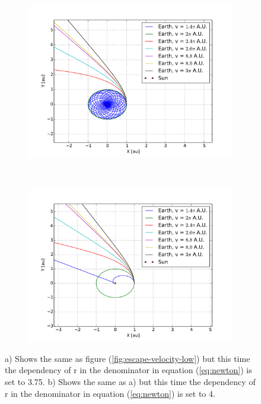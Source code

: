\begin{figure}[H]
    \centering
    \begin{subfigure}{0.5\textwidth}
        \centering
        \includegraphics[width=\linewidth]{result/bilder/escape-velocity-r275.pdf}
    	\caption{}
    \end{subfigure}%
    ~ 
    \begin{subfigure}{0.5\textwidth}
        \centering
        \includegraphics[width=\linewidth]{result/bilder/escape-velocity-r3.pdf}
        \caption{}
    \end{subfigure}
    \caption{a) Shows the same as figure (\ref{fig:escape-velocity-low}) but this time the dependency of r in the denominator in equation (\ref{eq:newton}) is set to 3.75. b) Shows the same as a) but this time the dependency of r in the denominator in equation (\ref{eq:newton}) is set to 4. }
    \label{fig:escape-velocity-high}
\end{figure}


